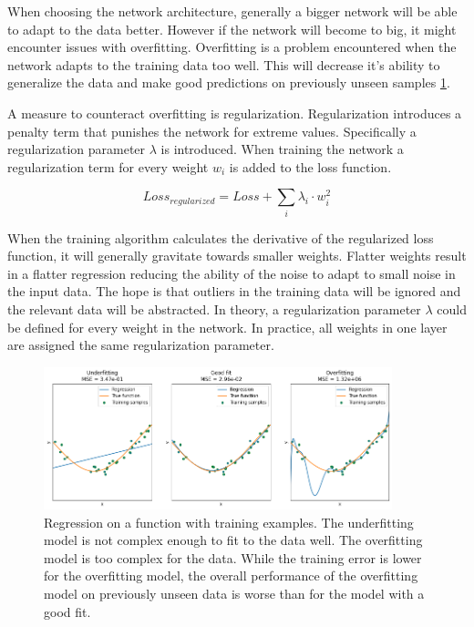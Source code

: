 When choosing the network architecture, generally a bigger network will be able to adapt to the data better.
However if the network will become to big, it might encounter issues with overfitting.
Overfitting is a problem encountered when the network adapts to the training data too well.
This will decrease it's ability to generalize the data and make good predictions on previously unseen samples \ref{fig:overfitting}.

A measure to counteract overfitting is regularization.
Regularization introduces a penalty term that punishes the network for extreme values.
Specifically a regularization parameter $\lambda$ is introduced.
When training the network a regularization term for every weight $w_i$ is added to the loss function.

$$
Loss_{regularized} = Loss +  \sum_i \lambda_i \cdot w_i^2 
$$

When the training algorithm calculates the derivative of the regularized loss function, it will generally gravitate towards smaller weights.
Flatter weights result in a flatter regression reducing the ability of the noise to adapt to small noise in the input data.
The hope is that outliers in the training data will be ignored and the relevant data will be abstracted.
In theory, a regularization parameter $\lambda$ could be defined for every weight in the network.
In practice, all weights in one layer are assigned the same regularization parameter.


\begin{figure} [h]
    \centering
    \includegraphics[width=0.9\textwidth]{figures/regression/overfitting.png} 
    \caption{Regression on a function with training examples. 
            The underfitting model is not complex enough to fit to the data well. 
            The overfitting model is too complex for the data.
            While the training error is lower for the overfitting model, 
            the overall performance of the overfitting model on previously unseen data 
            is worse than for the model with a good fit.
        }
    \label{fig:overfitting}
\end{figure}
  

